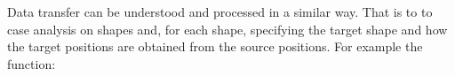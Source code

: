 \begin{code}%
\>[0]\AgdaSpace{}%
\AgdaSpace{}%
\AgdaSymbol{(}\AgdaSpace{}%
\AgdaSymbol{:}\AgdaSpace{}%
\AgdaSymbol{)}\AgdaSpace{}%
\AgdaSymbol{:}\AgdaSpace{}%
\AgdaSpace{}%
\<%
\\
\>[0][@{}l@{\AgdaIndent{0}}]%
\>[2]\AgdaSpace{}%
\AgdaSymbol{:}\AgdaSpace{}%
\AgdaSpace{}%
\<%
\\
%
\>[2]\AgdaSpace{}%
\AgdaSymbol{:}\AgdaSpace{}%
\AgdaSpace{}%
\AgdaSpace{}%
\AgdaSpace{}%
\<%
\\
%
\>[2]\AgdaSpace{}%
\AgdaSymbol{:}\AgdaSpace{}%
\AgdaSpace{}%
\AgdaSpace{}%
\AgdaSpace{}%
\AgdaSpace{}%
\AgdaSpace{}%
\<%
\\
%
\>[2]\AgdaSpace{}%
\AgdaSymbol{:}\AgdaSpace{}%
\AgdaSpace{}%
\AgdaSpace{}%
\AgdaSpace{}%
\AgdaSpace{}%
\AgdaSpace{}%
\AgdaSpace{}%
\AgdaSpace{}%
\<%
\\
%
\>[2]\<%
\end{code}

Data transfer can be understood and processed in a similar way. That is to to case analysis on shapes and, for each shape, specifying the target shape and how the target positions are obtained from the source positions. For example the  function:

\begin{code}%
\>[0]\AgdaSpace{}%
\AgdaSymbol{:}\AgdaSpace{}%
\AgdaSpace{}%
\AgdaSpace{}%
\AgdaSpace{}%
\AgdaSpace{}%
\<%
\\
\>[0]\AgdaSpace{}%
\AgdaSpace{}%
\AgdaSymbol{=}\AgdaSpace{}%
\<%
\\
\>[0]\AgdaSpace{}%
\AgdaSymbol{(}\AgdaSpace{}%
\AgdaSymbol{)}\AgdaSpace{}%
\AgdaSymbol{=}\AgdaSpace{}%
\<%
\\
\>[0]\AgdaSpace{}%
\AgdaSymbol{(}\AgdaSpace{}%
\AgdaSpace{}%
\AgdaSymbol{)}\AgdaSpace{}%
\AgdaSymbol{=}\AgdaSpace{}%
\AgdaSpace{}%
\<%
\\
\>[0]\AgdaSpace{}%
\AgdaSymbol{(}\AgdaSpace{}%
\AgdaSpace{}%
\AgdaSpace{}%
\AgdaSymbol{)}\AgdaSpace{}%
\AgdaSymbol{=}\AgdaSpace{}%
\AgdaSpace{}%
\AgdaSpace{}%
\<%
\\
\>[0]\<%
\end{code}

